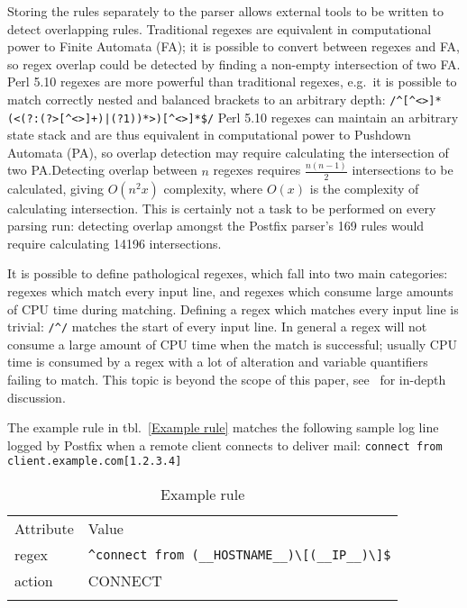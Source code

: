 \documentclass[draft]{svmult}
\newcommand{\tableline}[0]{%
    \noalign{\smallskip}%
    \hline%
    \noalign{\smallskip}%
}
\newcommand{\refwithlabel}[2]{%
    #1~\vref{#2}%
}
\newcommand{\tableref}[1]{%
    \refwithlabel{tbl.}{#1}%
}
\newcommand{\daemon}[1]{%
    \texttt{postfix/#1}%
}
\newcommand{\tab}[0]{%
    \hspace*{2em}%
}
\newcommand{\numberOFrules}[0]{%
    169%
}
\newcommand{\numberOFruleINTERSECTIONS}[0]{%
    14196%
}
\begin{document}
Storing the rules separately to the parser allows external tools to be
written to detect overlapping rules.  Traditional regexes are equivalent in
computational power to Finite Automata (FA); it is possible to convert
between regexes and FA, so regex overlap could be detected by finding a
non-empty intersection of two FA\@.  Perl 5.10 regexes are more powerful
than traditional regexes, e.g.\ it is possible to match correctly nested
and balanced brackets to an arbitrary depth:
\newline{}\tab{}\verb!/^[^<>]*(<(?:(?>[^<>]+)|(?1))*>)[^<>]*$/!\newline{}
Perl 5.10 regexes can maintain an arbitrary state stack and are thus
equivalent in computational power to Pushdown Automata (PA), so overlap
detection may require calculating the intersection of two PA.\@  Detecting
overlap between $n$ regexes requires $\frac{n(n-1)}{2}$ intersections to be
calculated, giving $O(n^2x)$ complexity, where $O(x)$ is the complexity of
calculating intersection.  This is certainly not a task to be performed on
every parsing run: detecting overlap amongst the Postfix parser's
\numberOFrules{} rules would require calculating
\numberOFruleINTERSECTIONS{} intersections.

It is possible to define pathological regexes, which fall into two main
categories: regexes which match every input line, and regexes which consume
large amounts of CPU time during matching.  Defining a regex which matches
every input line is trivial: \verb!/^/! matches the start of every input
line.  In general a regex will not consume a large amount of CPU time when
the match is successful; usually CPU time is consumed by a regex with a lot
of alteration and variable quantifiers failing to match.  This topic is
beyond the scope of this paper, see~\cite{mastering-regular-expressions}
for in-depth discussion.

\label{example rule}

The example rule in \tableref{Example rule} matches the following sample
log line logged by Postfix when a remote client connects to deliver mail:
\newline{}\tab{}\verb!connect from client.example.com[1.2.3.4]!

\begin{table}[htbp]
    \caption{Example rule}
    \empty{}\label{Example rule}
    \begin{tabular}[]{ll}
        \tableline{}%
        Attribute                 & Value                                            \\
        \tableline{}%
        regex                     & \verb!^connect from (__HOSTNAME__)\[(__IP__)\]$! \\
        action                    & CONNECT                                          \\
        \tableline{}%
    \end{tabular}
\end{table}
\end{document}
